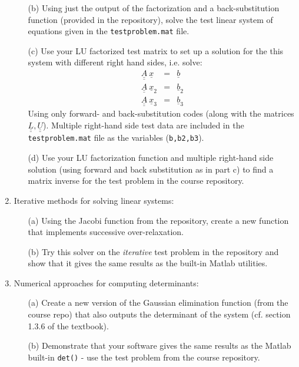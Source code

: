 \documentclass{article}
\begin{document}
\begin{enumerate}
\begin{itemize}
    \item[(b)] Using just the output of the factorization and a back-substitution function (provided in the repository), solve the test linear system of equations given in the \texttt{testproblem.mat} file.  
    \item[(c)] Use your LU factorized test matrix to set up a solution for the this system with different right hand sides, i.e. solve:
    \begin{eqnarray}
      \underline{\underline{A}} ~\underline{x} &=& \underline{b} \\
      \underline{\underline{A}} ~\underline{x}_2 &=& \underline{b}_2 \\
      \underline{\underline{A}} ~\underline{x}_3 &=& \underline{b}_3    
    \end{eqnarray}   
    Using only forward- and back-substitution codes (along with the matrices $\underline{\underline{L}}, \underline{\underline{U}}$).  Multiple right-hand side test data are included in the \texttt{testproblem.mat} file as the variables (\texttt{b,b2,b3}).
    \item[(d)] Use your LU factorization function and multiple right-hand side solution (using forward and back substitution as in part c) to find a matrix inverse for the test problem in the course repository.  
  \end{itemize}
  \item Iterative methods for solving linear systems:  
  \begin{itemize}
    \item[(a)] Using the Jacobi function from the repository, create a new function that implements successive over-relaxation.  
    \item[(b)] Try this solver on the \emph{iterative} test problem in the repository and show that it gives the same results as the built-in Matlab utilities. 
  \end{itemize}  
  \item Numerical approaches for computing determinants:  
  \begin{itemize}
    \item[(a)] Create a new version of the Gaussian elimination function (from the course repo) that also outputs the determinant of the system (cf. section 1.3.6 of the textbook).  
    \item[(b)] Demonstrate that your software gives the same results as the Matlab built-in \texttt{det()} - use the test problem from the course repository.  
    
  \end{itemize}
\end{enumerate}
\end{document}
